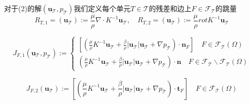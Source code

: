 \documentclass{article}
\begin{document}
对于(2)的解$(\boldsymbol{u}_{\mathcal{T}},p_{\mathcal{T}})$我们定义每个单元$T\in\mathcal{T}$的残差和边上$F\in \mathcal{F}_{\mathcal{T}}$的跳量
\begin{equation*}
R_{T,1}=(\boldsymbol{u}_{\mathcal{T}}):=\frac{\mu}{\rho}\nabla\cdot K^{-1}\boldsymbol{u}_{\mathcal{T}},\quad R_{T,2}=(\boldsymbol{u}_{\mathcal{T}}):=\frac{\mu}{\rho}rotK^{-1}\boldsymbol{u}_{\mathcal{T}}
\end{equation*}

\begin{equation*}
J_{F,1}(\boldsymbol{u}_{\mathcal{T}},p_{\mathcal{T}}):=
\begin{cases}
[(\frac{\mu}{\rho}K^{-1}\boldsymbol{u}_{\mathcal{T}}+\frac{\beta}{\rho}\left|\boldsymbol{u}_{\mathcal{T}}\right|\boldsymbol{u}_{\mathcal{T}}+\nabla p_{\mathcal{T}})\cdot\boldsymbol{n}_F]\quad F \in \mathcal{F}_{\mathcal{T}}(\Omega)\\
(\frac{\mu}{\rho}K^{-1}\boldsymbol{u}_{\mathcal{T}}+\frac{\beta}{\rho}\left|\boldsymbol{u}_{\mathcal{T}}\right|\boldsymbol{u}_{\mathcal{T}}+\nabla p_{\mathcal{T}})\cdot\boldsymbol{n}\quad F \in \mathcal{F}_{\mathcal{T}}\backslash \mathcal{F}_{\mathcal{T}}(\Omega)
\end{cases}
\end{equation*}

\begin{equation*}
J_{F,2}(\boldsymbol{u}_{\mathcal{T}}):=[(\frac{\mu}{\rho}K^{-1}\boldsymbol{u}_{\mathcal{T}}+\frac{\beta}{\rho}\left|\boldsymbol{u}_{\mathcal{T}}\right|\boldsymbol{u}_{\mathcal{T}}+\nabla p_{\mathcal{T}})\cdot\boldsymbol{t}_F]\quad F \in \mathcal{F}_{\mathcal{T}}(\Omega)
\end{equation*}
\end{document}
